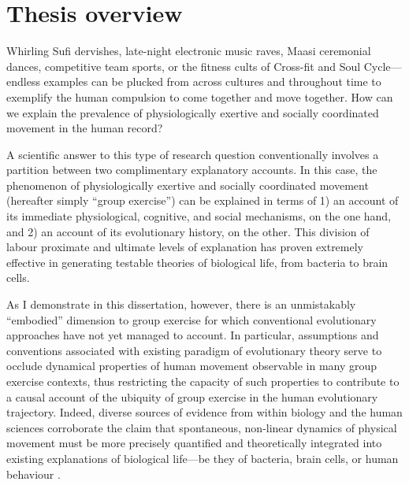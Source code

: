 


\section{Thesis overview}

Whirling Sufi dervishes, late-night electronic music raves, Maasi ceremonial dances, competitive team sports, or the fitness cults of Cross-fit and Soul Cycle---endless examples can be plucked from across cultures and throughout time to exemplify the human compulsion to come together and move together.  How can we explain the prevalence of physiologically exertive and socially coordinated movement in the human record?

A scientific answer to this type of research question conventionally involves a partition between two complimentary explanatory accounts.  In this case, the phenomenon of physiologically exertive and socially coordinated movement (hereafter simply ``group exercise'') can be explained in terms of 1) an account of its immediate physiological, cognitive, and social mechanisms, on the one hand, and 2) an account of its evolutionary history, on the other.  This division of labour proximate and ultimate levels of explanation has proven extremely effective in generating testable theories of biological life, from bacteria to brain cells.

As I demonstrate in this dissertation, however, there is an unmistakably ``embodied'' dimension to group exercise for which conventional evolutionary approaches have not yet managed to account. In particular, assumptions and conventions associated with existing paradigm of evolutionary theory serve to occlude dynamical properties of human movement observable in many group exercise contexts, thus restricting the capacity of such properties to contribute to a causal account of the ubiquity of group exercise in the human evolutionary trajectory.  Indeed, diverse sources of evidence from within biology and the human sciences corroborate the claim that spontaneous, non-linear dynamics of physical movement must be more precisely quantified and theoretically integrated into existing explanations of biological life---be they of bacteria, brain cells, or human behaviour \citep{Nowak2006,Kelso2016,Laland2011,Laland2015,Yufik2017a,Nowak2017}.

